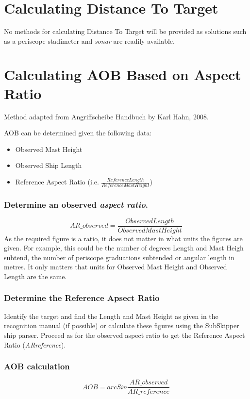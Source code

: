 \documentclass{article}
\begin{document}
\section{Calculating Distance To Target}

No methods for calculating Distance To Target will be provided as solutions such as a periscope stadimeter and \emph{sonar} are readily available.

\section{Calculating AOB Based on Aspect Ratio}

Method adapted from Angriffscheibe Handbuch by Karl Hahn, 2008.

AOB can be determined given the following data:
\begin{itemize}
\item{Observed Mast Height}
\item{Observed Ship Length}
\item{Reference Aspect Ratio (i.e. $\frac{Reference Length}{Reference Mast Height}$)}
\end{itemize}

\subsubsection{Determine an observed \emph{aspect ratio}.}
$$AR\_{observed} = \frac{Observed Length}{Observed Mast Height}$$
As the required figure is a ratio, it does not matter in what units the figures are given. For example, this could be the number of degrees Length and Mast Heigh subtend, the number of periscope graduations subtended or angular length in metres. It only matters that units for Observed Mast Height and Observed Length are the same.

\subsubsection{Determine the Reference Apsect Ratio}
Identify the target and find the Length and Mast Height as given in the recognition manual (if possible) or calculate these figures using the SubSkipper ship parser. Proceed as for the observed aspect ratio to get the Reference Aspect Ratio (\emph{ARreference}).

\subsubsection{AOB calculation}
$$AOB = arcSin \frac{AR\_{observed}}{AR\_{reference}}$$
\end{document}
